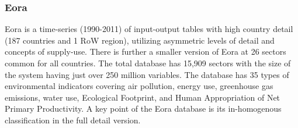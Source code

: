 \subsubsection{Eora}


Eora is a time-series (1990-2011) of input-output tables with high country detail (187 countries and 1 RoW region), utilizing asymmetric levels of detail and concepts of supply-use. There is further a smaller version of Eora at 26 sectors common for all countries. The total database has 15,909 sectors with the size of the system having just over 250 million variables. The database has 35 types of environmental indicators covering air pollution, energy use, greenhouse gas emissions, water use, Ecological Footprint, and Human Appropriation of Net Primary Productivity. A key point of the Eora database is its in-homogenous classification in the full detail version.

